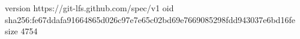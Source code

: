 version https://git-lfs.github.com/spec/v1
oid sha256:fe67ddafa91664865d026c97e7e65c02bd69e7669085298fdd943037e6bd16fe
size 4754
